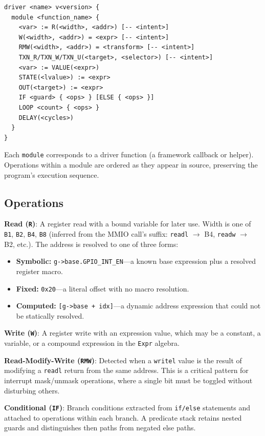 \documentclass[sigplan, screen, review, anonymous]{acmart}
\begin{document}
\begin{lstlisting}[language=ris]
driver <name> v<version> {
  module <function_name> {
    <var> := R(<width>, <addr>) [-- <intent>]
    W(<width>, <addr>) = <expr> [-- <intent>]
    RMW(<width>, <addr>) = <transform> [-- <intent>]
    TXN_R/TXN_W/TXN_U(<target>, <selector>) [-- <intent>]
    <var> := VALUE(<expr>)
    STATE(<lvalue>) := <expr>
    OUT(<target>) := <expr>
    IF <guard> { <ops> } [ELSE { <ops> }]
    LOOP <count> { <ops> }
    DELAY(<cycles>)
  }
}
\end{lstlisting}

Each \texttt{module} corresponds to a driver function (a framework callback or helper). Operations within a module are ordered as they appear in source, preserving the program's execution sequence.

\subsection{Operations}

\textbf{Read (\texttt{R})}: A register read with a bound variable for later use. Width is one of \texttt{B1}, \texttt{B2}, \texttt{B4}, \texttt{B8} (inferred from the MMIO call's suffix: \texttt{readl} $\rightarrow$ B4, \texttt{readw} $\rightarrow$ B2, etc.). The address is resolved to one of three forms:

\begin{itemize}
\item \textbf{Symbolic:} \texttt{g->base.GPIO\_INT\_EN}---a known base expression plus a resolved register macro.
\item \textbf{Fixed:} \texttt{0x20}---a literal offset with no macro resolution.
\item \textbf{Computed:} \texttt{[g->base + idx]}---a dynamic address expression that could not be statically resolved.
\end{itemize}

\textbf{Write (\texttt{W})}: A register write with an expression value, which may be a constant, a variable, or a compound expression in the \texttt{Expr} algebra.

\textbf{Read-Modify-Write (\texttt{RMW})}: Detected when a \texttt{writel} value is the result of modifying a \texttt{readl} return from the same address. This is a critical pattern for interrupt mask/unmask operations, where a single bit must be toggled without disturbing others.

\textbf{Conditional (\texttt{IF})}: Branch conditions extracted from \texttt{if/else} statements and attached to operations within each branch. A predicate stack retains nested guards and distinguishes then paths from negated else paths.
\end{document}
